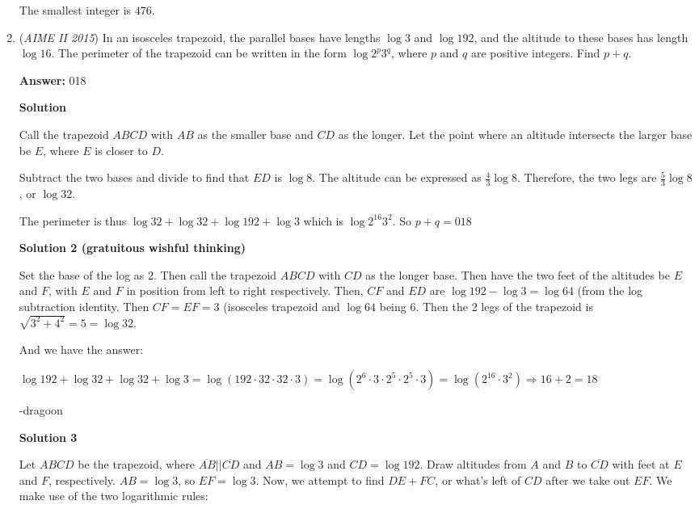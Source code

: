 \begin{enumerate}
 The smallest integer is $\boxed{476}$.

 


 


	\item (\textit{AIME II 2015}) In an isosceles trapezoid, the parallel bases have lengths $\log 3$ and $\log 192$, and the altitude to these bases has length $\log 16$. The perimeter of the trapezoid can be written in the form $\log 2^p 3^q$, where $p$ and $q$ are positive integers. Find $p + q$.


 
 \textbf{Answer: }018



\textbf{Solution}

Call the trapezoid $ABCD$ with $AB$ as the smaller base and $CD$ as the longer. Let the point where an altitude intersects the larger base be $E$, where $E$ is closer to $D$. 

 Subtract the two bases and divide to find that $ED$ is $\log 8$. The altitude can be expressed as $\frac{4}{3} \log 8$. Therefore, the two legs are $\frac{5}{3} \log 8$, or $\log 32$.

 The perimeter is thus $\log 32 + \log 32 + \log 192 + \log 3$ which is $\log 2^{16} 3^2$. So $p + q = \boxed{018}$




\textbf{Solution 2 (gratuitous wishful thinking)}

Set the base of the log as 2. Then call the trapezoid $ABCD$ with $CD$ as the longer base. Then have the two feet of the altitudes be $E$ and $F$, with $E$ and $F$ in position from left to right respectively. Then, $CF$ and $ED$ are $\log 192 - \log 3 = \log 64$ (from the log subtraction identity. Then $CF=EF=3$ (isosceles trapezoid and $\log 64$ being 6. Then the 2 legs of the trapezoid is $\sqrt{3^2+4^2}=5=\log 32$.

 And we have the answer:

 $\log 192 + \log 32 + \log 32 + \log 3 = \log(192 \cdot 32 \cdot 32 \cdot 3) = \log(2^6 \cdot 3 \cdot 2^5 \cdot 2^5 \cdot 3) = \log(2^{16} \cdot 3^2) \Rightarrow 16+2 = \boxed{18}$

 -dragoon

 



\textbf{Solution 3}

Let $ABCD$ be the trapezoid, where $\overline{AB} || \overline{CD}$ and $AB = \log 3$ and $CD = \log 192$. Draw altitudes from $A$ and $B$ to $\overline{CD}$ with feet at $E$ and $F$, respectively. $AB = \log 3$, so $EF = \log 3$. Now, we attempt to find $DE + FC$, or what's left of $CD$ after we take out $EF$. We make use of the two logarithmic rules:


\end{enumerate}
